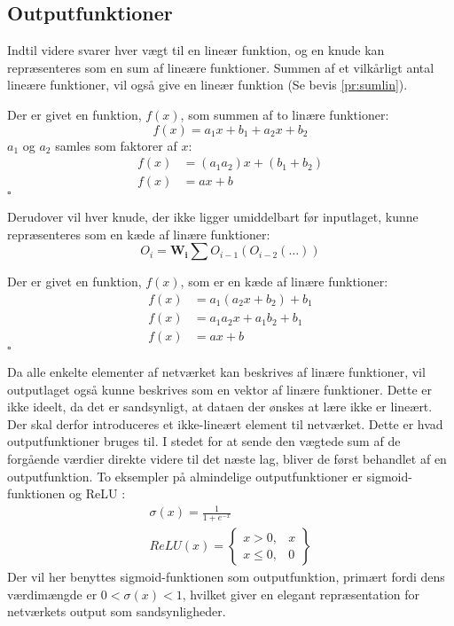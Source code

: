 \documentclass[../SOP.tex]{subfile}
\begin{document}
\subsection{Outputfunktioner}
Indtil videre svarer hver vægt til en lineær funktion, og en knude kan repræsenteres som en sum af lineære funktioner. Summen af et vilkårligt antal lineære funktioner, vil også give en lineær funktion (Se bevis \ref{pr:sumlin}).
\begin{bevis}\label{pr:sumlin}
  Der er givet en funktion, $f(x)$, som summen af to linære funktioner:
  \begin{equation*}
    f(x)=a_1x+b_1+a_2x+b_2
  \end{equation*}
  $a_1$ og $a_2$ samles som faktorer af $x$:
  \begin{align*}
    f(x)&=(a_1a_2)x+(b_1+b_2)\\
    f(x)&=ax+b
  \end{align*}
  \hfill $\square$
\end{bevis}
Derudover vil hver knude, der ikke ligger umiddelbart før inputlaget, kunne repræsenteres som en kæde af linære funktioner:
\begin{equation*}
  O_i=\mathbf{W_i}\sum O_{i-1}(O_{i-2}(\dots))
\end{equation*}
\begin{bevis}\label{pr:chainlin}
  Der er givet en funktion, $f(x)$, som er en kæde af linære funktioner:
  \begin{align*}
    f(x)&= a_1(a_2x+b_2)+b_1\\
    f(x)&= a_1a_2x + a_1b_2 +b_1\\
    f(x)&= ax+b
  \end{align*}
  \hfill $\square$
\end{bevis}
Da alle enkelte elementer af netværket kan beskrives af linære funktioner, vil outputlaget også kunne beskrives som en vektor af linære funktioner. Dette er ikke ideelt, da det er sandsynligt, at dataen der ønskes at lære ikke er lineært. Der skal derfor introduceres et ikke-lineært element til netværket. Dette er hvad outputfunktioner bruges til. I stedet for at sende den vægtede sum af de forgående værdier direkte videre til det næste lag, bliver de først behandlet af en outputfunktion. To eksempler på almindelige outputfunktioner er sigmoid-funktionen og ReLU \parencite{activation}:
\begin{gather*}
  \sigma(x)=\frac{1}{1+e^{-x}}\\
  ReLU(x)=\begin{Bmatrix}
    x>0, & x\\
    x\leq 0, & 0
  \end{Bmatrix}
\end{gather*}
Der vil her benyttes sigmoid-funktionen som outputfunktion, primært fordi dens værdimængde er $0 < \sigma(x) < 1$, hvilket giver en elegant repræsentation for netværkets output som sandsynligheder.
\end{document}
